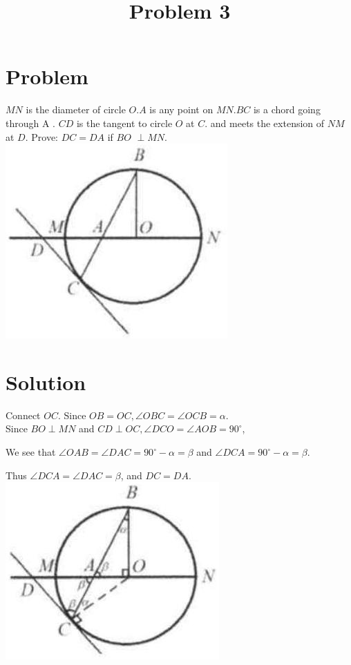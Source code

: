 \documentclass{article}
\title{Problem 3}
\date{}
\begin{document}
\maketitle

\section*{Problem}
\(M N\) is the diameter of circle \(O . A\) is any point on \(M N . B C\) is a chord going through A . \(C D\) is the tangent to circle \(O\) at \(C\). and meets the extension of \(N M\) at \(D\). Prove: \(D C=D A\) if \(B O\) \(\perp M N\).\\
\centering
\includegraphics[width=\textwidth]{images/problem_image_1.jpg}

\section*{Solution}
Connect \(O C\). Since \(O B=O C, \angle O B C=\angle O C B=\alpha\).\\
Since \(B O \perp M N\) and \(C D \perp O C, \angle D C O=\angle A O B=90^{\circ}\),

We see that \(\angle O A B=\angle D A C=90^{\circ}-\alpha=\beta\) and \(\angle D C A=90^{\circ}-\alpha=\beta\).

Thus \(\angle D C A=\angle D A C=\beta\), and \(D C=D A\).\\
\centering
\includegraphics[width=\textwidth]{images/reasoning_image_1.jpg}
\end{document}
